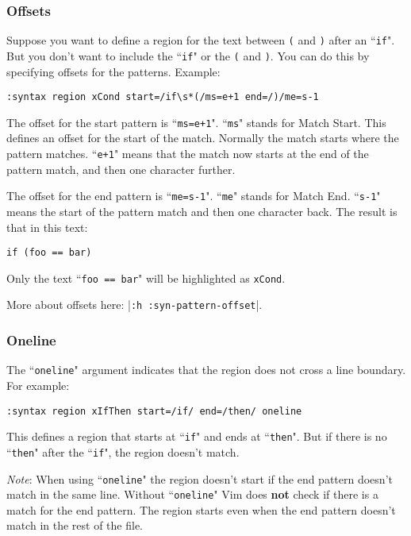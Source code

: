 \subsubsection{Offsets}
Suppose you want to define a region for the text between \texttt{(} and \texttt{)} after an ``\texttt{if}".
But you don't want to include the ``\texttt{if}" or the \texttt{(} and \texttt{)}.
You can do this by specifying offsets for the patterns.
Example:

\begin{Verbatim}[samepage=true]
 :syntax region xCond start=/if\s*(/ms=e+1 end=/)/me=s-1
\end{Verbatim}

The offset for the start pattern is ``\texttt{ms=e+1}".
``\texttt{ms}" stands for Match Start.
This defines an offset for the start of the match.
Normally the match starts where the pattern matches.
``\texttt{e+1}" means that the match now starts at the end of the pattern match, and then one character further.

The offset for the end pattern is ``\texttt{me=s-1}".
``\texttt{me}" stands for Match End.
``\texttt{s-1}" means the start of the pattern match and then one character back.
The result is that in this text:

\begin{Verbatim}[samepage=true]
    if (foo == bar) 
\end{Verbatim}

Only the text ``\texttt{foo == bar}" will be highlighted as \texttt{xCond}.

More about offsets here: |\texttt{:h :syn-pattern-offset}|.
\subsubsection{Oneline}
The ``\texttt{oneline}" argument indicates that the region does not cross a line boundary.
For example:

\begin{Verbatim}[samepage=true]
 :syntax region xIfThen start=/if/ end=/then/ oneline
\end{Verbatim}

This defines a region that starts at ``\texttt{if}" and ends at ``\texttt{then}".
But if there is no ``\texttt{then}" after the ``\texttt{if}", the region doesn't match.

\emph{Note}: When using ``\texttt{oneline}" the region doesn't start if the end pattern doesn't match in the same line.
Without ``\texttt{oneline}" Vim does \textbf{not} check if there is a match for the end pattern.
The region starts even when the end pattern doesn't match in the rest of the file.

